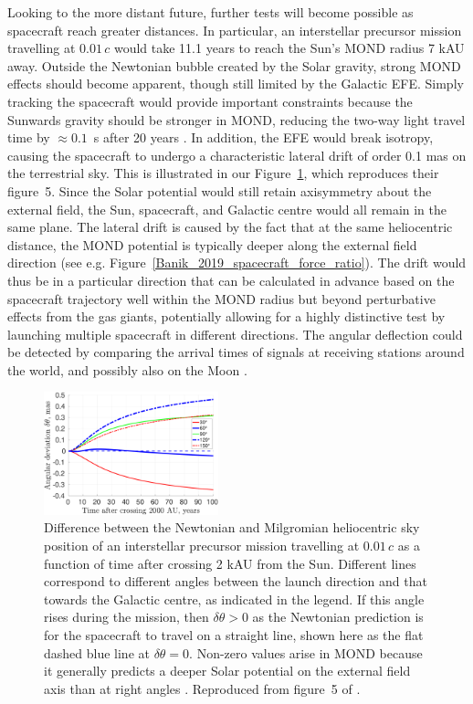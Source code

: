\documentclass[fleqn,usenatbib,useAMS,onecolumn]{mnras} %
\begin{document}
Looking to the more distant future, further tests will become possible as spacecraft reach greater distances. In particular, an interstellar precursor mission travelling at $0.01\,c$ would take 11.1 years to reach the Sun's MOND radius 7 kAU away. Outside the Newtonian bubble created by the Solar gravity, strong MOND effects should become apparent, though still limited by the Galactic EFE. Simply tracking the spacecraft would provide important constraints because the Sunwards gravity should be stronger in MOND, reducing the two-way light travel time by $\approx 0.1$~s after 20 years \citep{Banik_2019_spacecraft}. In addition, the EFE would break isotropy, causing the spacecraft to undergo a characteristic lateral drift of order 0.1 mas on the terrestrial sky. This is illustrated in our Figure~\ref{Banik_2019_spacecraft_angle_time}, which reproduces their figure~5. Since the Solar potential would still retain axisymmetry about the external field, the Sun, spacecraft, and Galactic centre would all remain in the same plane. The lateral drift is caused by the fact that at the same heliocentric distance, the MOND potential is typically deeper along the external field direction (see e.g. Figure~\ref{Banik_2019_spacecraft_force_ratio}). The drift would thus be in a particular direction that can be calculated in advance based on the spacecraft trajectory well within the MOND radius but beyond perturbative effects from the gas giants, potentially allowing for a highly distinctive test by launching multiple spacecraft in different directions. The angular deflection could be detected by comparing the arrival times of signals at receiving stations around the world, and possibly also on the Moon \citep{Kurdubov_2019}.

\begin{figure}
	\centering
	\includegraphics[width=0.45\textwidth]{Banik_2019_spacecraft_Figure_5}
	\caption{Difference between the Newtonian and Milgromian heliocentric sky position of an interstellar precursor mission travelling at $0.01\,c$ as a function of time after crossing 2 kAU from the Sun. Different lines correspond to different angles between the launch direction and that towards the Galactic centre, as indicated in the legend. If this angle rises during the mission, then $\delta \theta > 0$ as the Newtonian prediction is for the spacecraft to travel on a straight line, shown here as the flat dashed blue line at $\delta \theta = 0$. Non-zero values arise in MOND because it generally predicts a deeper Solar potential on the external field axis than at right angles \citep[Equation~\ref{Point_mass_EFE_QUMOND}, see also][]{Banik_2018_EFE}. Reproduced from figure~5 of \citet{Banik_2019_spacecraft}.}
	\label{Banik_2019_spacecraft_angle_time}
\end{figure}
\end{document}
